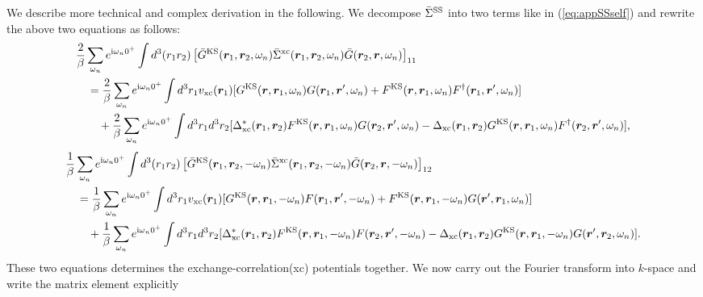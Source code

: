 We describe more technical and complex derivation in the following.
We decompose $\bar{\Sigma}^{\rm SS} $ into two terms like in (\ref{eq:appSSself}) and rewrite the 
above two equations as follows:
%
\begin{equation}
	\begin{split}
	& \frac{2}{\beta} \sum_{\omega_n}
	e^{ {\rm i}\omega_n 0^{+}} 
	\int d^3(r_1 r_2) \left[ \bar{G}^{\rm KS}(\bm r_1, \bm r_2, \omega_n)
	\bar{\Sigma }^{\rm xc}(\bm r_1, \bm r_2, \omega_n) \bar{G}(\bm r_2, \bm r, \omega_n)
	\right]_{11} \\
	&\quad =
	\frac{2}{\beta}\sum_{\omega_n} e^{ {\rm i}\omega_n 0^{+}}\int d^3r_1 
	v_{\rm xc}(\bm r_1) [G^{\rm KS}(\bm r,\bm r_1,\omega_n)G(\bm r_1, \bm r', \omega_n)+
	F^{\rm KS}(\bm r, \bm r_1, \omega_n)F^{\dag}(\bm r_1, \bm r', \omega_n)] \\
	&\quad \quad + 
	\frac{2}{\beta}\sum_{\omega_n}e^{ {\rm i}\omega_n 0^{+}}
	\int d^3r_1 d^3r_2 
	[\Delta_{\rm xc}^{\ast}(\bm r_1, \bm r_2)
	F^{\rm KS}(\bm r,\bm r_1, \omega_n)G(\bm r_2, \bm r', \omega_n) 
	- \Delta_{\rm xc}(\bm r_1, \bm r_2)
	G^{\rm KS}(\bm r,\bm r_1, \omega_n)F^{\dag}(\bm r_2, \bm r', \omega_n) 
	],
	\label{eq:11comp1}
\end{split}
\end{equation}
%
\begin{equation}
	\begin{split}
	& \frac{1}{\beta} \sum_{\omega_n}
	e^{ {\rm i}\omega_n 0^{+}} 
	\int d^3(r_1 r_2) \left[ \bar{G}^{\rm KS}(\bm r_1, \bm r_2, -\omega_n)
	\bar{\Sigma }^{\rm xc}(\bm r_1, \bm r_2, -\omega_n) \bar{G}(\bm r_2, \bm r, -\omega_n)
	\right]_{12} \\
	&\quad =
	\frac{1}{\beta}\sum_{\omega_n} e^{ {\rm i}\omega_n 0^{+}}\int d^3r_1 
	v_{\rm xc}(\bm r_1) [G^{\rm KS}(\bm r,\bm r_1,-\omega_n)F(\bm r_1, \bm r', -\omega_n)+
	F^{\rm KS}(\bm r, \bm r_1, -\omega_n)G(\bm r', \bm r_1, \omega_n)] \\
	&\quad \quad + 
	\frac{1}{\beta}\sum_{\omega_n}e^{ {\rm i}\omega_n 0^{+}}
	\int d^3r_1 d^3r_2 
	[\Delta_{\rm xc}^{\ast}(\bm r_1, \bm r_2)
	F^{\rm KS}(\bm r,\bm r_1, -\omega_n)F(\bm r_2, \bm r', -\omega_n) 
	- \Delta_{\rm xc}(\bm r_1, \bm r_2)
	G^{\rm KS}(\bm r,\bm r_1, -\omega_n)G(\bm r', \bm r_2, \omega_n) 
	].
	\label{eq:12comp1}
\end{split}
\end{equation}
%
These two equations determines the exchange-correlation(xc) potentials together.
We now carry out the Fourier transform into $k$-space and write the matrix element explicitly
